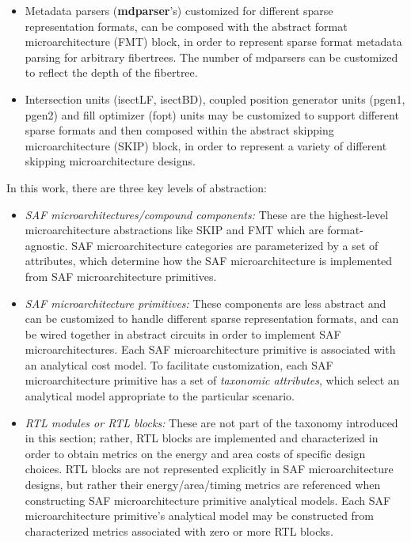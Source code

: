 \begin{itemize}
    \item Metadata parsers (\textbf{mdparser}'s) customized for different sparse representation formats, can be composed with the abstract format microarchitecture (FMT) block, in order to represent sparse format metadata parsing for arbitrary fibertrees. The number of mdparsers can be customized to reflect the depth of the fibertree.
    \item Intersection units (isectLF, isectBD), coupled position generator units (pgen1, pgen2) and fill optimizer (fopt) units may be customized to support different sparse formats and then composed within the abstract skipping microarchitecture (SKIP) block, in order to represent a variety of different skipping microarchitecture designs.
\end{itemize}

In this work, there are three key levels of abstraction:

\begin{itemize}
    \item \textit{SAF microarchitectures/compound components:} These are the highest-level microarchitecture abstractions like SKIP and FMT which are format-agnostic. SAF microarchitecture categories are parameterized by a set of attributes, which determine how the SAF microarchitecture is implemented from SAF microarchitecture primitives.
    \item \textit{SAF microarchitecture primitives:} These components are less abstract and can be customized to handle different sparse representation formats, and can be wired together in abstract circuits in order to implement SAF microarchitectures. Each SAF microarchitecture primitive is associated with an analytical cost model. To facilitate customization, each SAF microarchitecture primitive has a set of \textit{taxonomic attributes}, which select an analytical model appropriate to the particular scenario.
    \item \textit{RTL modules or RTL blocks:} These are not part of the taxonomy introduced in this section; rather, RTL blocks are implemented and characterized in order to obtain metrics on the energy and area costs of specific design choices. RTL blocks are not represented explicitly in SAF microarchitecture designs, but rather their energy/area/timing metrics are referenced when constructing SAF microarchitecture primitive analytical models. Each SAF microarchitecture primitive's analytical model may be constructed from characterized metrics associated with zero or more RTL blocks.
\end{itemize}

